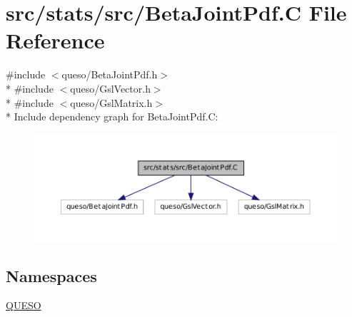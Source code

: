 \hypertarget{_beta_joint_pdf_8_c}{\section{src/stats/src/\-Beta\-Joint\-Pdf.C File Reference}
\label{_beta_joint_pdf_8_c}
}
{\ttfamily \#include $<$queso/\-Beta\-Joint\-Pdf.\-h$>$}\\*
{\ttfamily \#include $<$queso/\-Gsl\-Vector.\-h$>$}\\*
{\ttfamily \#include $<$queso/\-Gsl\-Matrix.\-h$>$}\\*
Include dependency graph for Beta\-Joint\-Pdf.\-C\-:
\nopagebreak
\begin{figure}[H]
\begin{center}
\leavevmode
\includegraphics[width=350pt]{_beta_joint_pdf_8_c__incl}
\end{center}
\end{figure}
\subsection*{Namespaces}
\begin{DoxyCompactItemize}
\item 
\hyperlink{namespace_q_u_e_s_o}{Q\-U\-E\-S\-O}
\end{DoxyCompactItemize}
